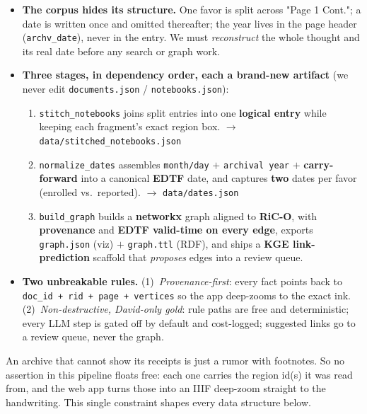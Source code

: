 \documentclass[11pt]{article}
\newcommand{\code}[1]{\texttt{\small #1}}
\begin{document}
\begin{itemize}[leftmargin=1.4em]
  \item \textbf{The corpus hides its structure.} One favor is split across "Page 1 Cont."; a date is
        written once and omitted thereafter; the year lives in the page header (\code{archv\_date}),
        never in the entry. We must \emph{reconstruct} the whole thought and its real date before any
        search or graph work.
  \item \textbf{Three stages, in dependency order, each a brand-new artifact} (we never edit
        \code{documents.json} / \code{notebooks.json}):
        \begin{enumerate}[leftmargin=1.6em, label=\arabic*.]
          \item \code{stitch\_notebooks} joins split entries into one \textbf{logical entry} while
                keeping each fragment's exact region box. $\to$ \code{data/stitched\_notebooks.json}
          \item \code{normalize\_dates} assembles \code{month/day} $+$ \code{archival year} $+$
                \textbf{carry-forward} into a canonical \textbf{EDTF} date, and captures
                \textbf{two} dates per favor (enrolled vs.\ reported). $\to$ \code{data/dates.json}
          \item \code{build\_graph} builds a \textbf{networkx} graph aligned to \textbf{RiC-O}, with
                \textbf{provenance} and \textbf{EDTF valid-time on every edge}, exports
                \code{graph.json} (viz) $+$ \code{graph.ttl} (RDF), and ships a \textbf{KGE
                link-prediction} scaffold that \emph{proposes} edges into a review queue.
        \end{enumerate}
  \item \textbf{Two unbreakable rules.} (1)~\emph{Provenance-first}: every fact points back to
        \code{doc\_id + rid + page + vertices} so the app deep-zooms to the exact ink.
        (2)~\emph{Non-destructive, David-only gold}: rule paths are free and deterministic; every LLM
        step is gated off by default and cost-logged; suggested links go to a review queue, never the
        graph.
\end{itemize}

\begin{rulebox}
An archive that cannot show its receipts is just a rumor with footnotes. So no assertion in this
pipeline floats free: each one carries the region id(s) it was read from, and the web app turns those
into an IIIF deep-zoom straight to the handwriting. This single constraint shapes every data structure
below.
\end{rulebox}
\end{document}
